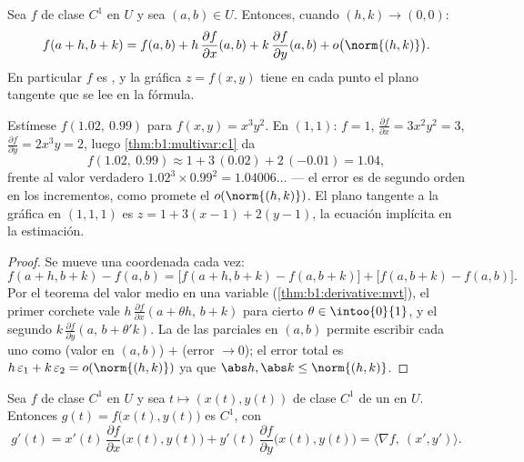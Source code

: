 \begin{theorem}\label{thm:b1:multivar:c1}
Sea $f$ de clase $C^1$ en $U$ y sea $(a,b) \in U$. Entonces, cuando $(h, k) \to
(0,0)$:
\[
f(a + h, b + k) = f(a, b)
+ h\,\frac{\partial f}{\partial x}(a,b)
+ k\,\frac{\partial f}{\partial y}(a,b)
+ o\bigl(\norm{(h,k)}\bigr) .
\]
En particular $f$ es , y la gráfica $z = f(x,y)$ tiene en
cada punto el plano tangente que se lee en la fórmula.
\end{theorem}

\begin{example}
\label{ex:b1:multivar:linapprox}
Estímese $f(1.02,\ 0.99)$ para $f(x, y) = x^3y^2$. En $(1, 1)$:
$f = 1$, $\frac{\partial f}{\partial x} = 3x^2y^2 = 3$,
$\frac{\partial f}{\partial y} = 2x^3y = 2$, luego
\cref{thm:b1:multivar:c1} da
\[
f(1.02,\ 0.99) \approx 1 + 3\,(0.02) + 2\,(-0.01) = 1.04 ,
\]
frente al valor verdadero $1.02^3 \times 0.99^2 = 1.04006\dots$ ---
el error es de segundo orden en los incrementos, como promete el
$o(\norm{(h,k)})$. El plano tangente a la gráfica en
$(1, 1, 1)$ es $z = 1 + 3(x - 1) + 2(y - 1)$, la ecuación
implícita en la estimación.
\end{example}

\begin{proof}
Se mueve una coordenada cada vez:
\[
f(a+h, b+k) - f(a,b)
= \bigl[f(a+h, b+k) - f(a, b+k)\bigr] + \bigl[f(a, b+k) -
f(a,b)\bigr].
\]
Por el teorema del valor medio en una variable
(\cref{thm:b1:derivative:mvt}), el primer corchete vale $h\,
\frac{\partial f}{\partial x}(a + \theta h,\, b + k)$ para cierto
$\theta \in \intoo{0}{1}$, y el segundo $k\,\frac{\partial
f}{\partial y}(a,\, b + \theta' k)$. La  de las parciales en
$(a,b)$ permite escribir cada uno como (valor en $(a,b)$) $+$
(error $\to 0$); el error total es $h\,\varepsilon_1 +
k\,\varepsilon_2 = o(\norm{(h,k)})$ ya que $\abs h, \abs k \leq
\norm{(h,k)}$.
\end{proof}

\begin{theorem}\label{thm:b1:multivar:chain}
Sea $f$ de clase $C^1$ en $U$ y sea $t \mapsto (x(t), y(t))$ de clase $C^1$ de
un  en $U$. Entonces $g(t) = f\bigl(x(t), y(t)\bigr)$ es
$C^1$, con
\[
g'(t) = x'(t)\,\frac{\partial f}{\partial x}\bigl(x(t),y(t)\bigr)
+ y'(t)\,\frac{\partial f}{\partial y}\bigl(x(t),y(t)\bigr)
= \bigl\langle \nabla f,\ (x', y')\bigr\rangle .
\]
\end{theorem}

